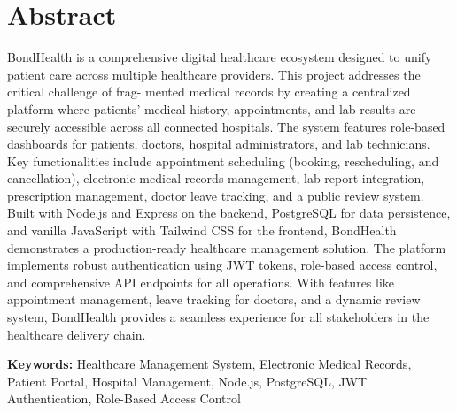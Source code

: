 \chapter*{Abstract}

BondHealth is a comprehensive digital healthcare ecosystem designed to unify patient care
across multiple healthcare providers. This project addresses the critical challenge of frag-
mented medical records by creating a centralized platform where patients' medical history,
appointments, and lab results are securely accessible across all connected hospitals. The
system features role-based dashboards for patients, doctors, hospital administrators, and lab
technicians. Key functionalities include appointment scheduling (booking, rescheduling, and
cancellation), electronic medical records management, lab report integration, prescription
management, doctor leave tracking, and a public review system. Built with Node.js and Express
on the backend, PostgreSQL for data persistence, and vanilla JavaScript with Tailwind CSS
for the frontend, BondHealth demonstrates a production-ready healthcare management
solution. The platform implements robust authentication using JWT tokens, role-based
access control, and comprehensive API endpoints for all operations. With features like
appointment management, leave tracking for doctors, and a dynamic review system,
BondHealth provides a seamless experience for all stakeholders in the healthcare delivery
chain.

\vspace{0.5cm}
\noindent\textbf{Keywords:} Healthcare Management System, Electronic Medical Records, Patient
Portal, Hospital Management, Node.js, PostgreSQL, JWT Authentication, Role-Based
Access Control
